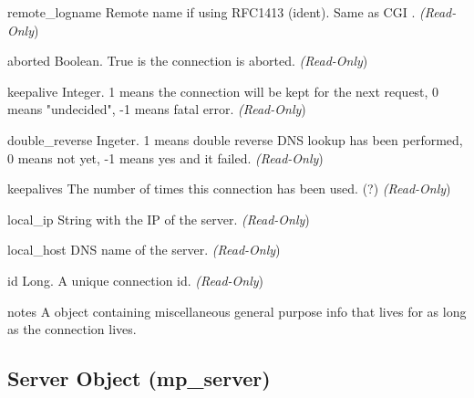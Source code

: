 \begin{memberdesc}[connection]{remote_logname}
Remote name if using RFC1413 (ident). Same as CGI .
\emph{(Read-Only})
\end{memberdesc}

\begin{memberdesc}[connection]{aborted}
Boolean. True is the connection is aborted.
\emph{(Read-Only})
\end{memberdesc}

\begin{memberdesc}[connection]{keepalive}
Integer. 1 means the connection will be kept for the next request, 0 means
"undecided", -1 means fatal error.
\emph{(Read-Only})
\end{memberdesc}

\begin{memberdesc}[connection]{double_reverse}
Ingeter. 1 means double reverse DNS lookup has been performed, 0 means
not yet, -1 means yes and it failed.
\emph{(Read-Only})
\end{memberdesc}

\begin{memberdesc}[connection]{keepalives}
The number of times this connection has been used. (?)
\emph{(Read-Only})
\end{memberdesc}

\begin{memberdesc}[connection]{local_ip}
String with the IP of the server.
\emph{(Read-Only})
\end{memberdesc}

\begin{memberdesc}[connection]{local_host}
DNS name of the server.
\emph{(Read-Only})
\end{memberdesc}

\begin{memberdesc}[connection]{id}
Long. A unique connection id.
\emph{(Read-Only})
\end{memberdesc}

\begin{memberdesc}[connection]{notes}
A  object containing miscellaneous general purpose info that lives for
as long as the connection lives. 
\end{memberdesc}


\subsection{Server Object (mp_server)\label{pyapi-mpserver}}

